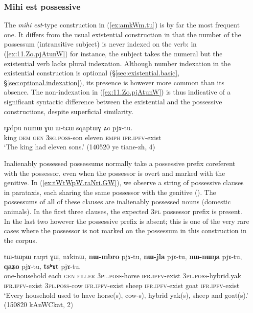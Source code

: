   
 \subsubsection{Mihi est possessive} \label{sec:possessive.mihi.est}
The \textit{mihi est}-type construction in (\ref{ex:amkWm.tu}) is by far the most frequent one.  It differs from the usual existential construction in that the number of the possessum (intransitive subject) is never indexed on the verb: in (\ref{ex:11.Zo.pjAtunW}) for instance, the subject  takes the numeral  but the existential verb  lacks plural indexation. Although number indexation in the existential construction is optional (§\ref{sec:existential.basic}, §\ref{sec:optional.indexation}), its presence is however more common than its absence. The non-indexation in (\ref{ex:11.Zo.pjAtunW}) is thus indicative of a significant syntactic difference between the existential and the possessive constructions, despite superficial similarity.
  
\begin{exe}
\ex \label{ex:11.Zo.pjAtunW}
\gll   rɟɤlpu nɯnɯ ɣɯ ɯ-tɕɯ sqaptɯɣ ʑo pjɤ-tu. \\
king \textsc{dem} \textsc{gen}  \textsc{3sg}.\textsc{poss}-son eleven \textsc{emph} \textsc{ifr}.\textsc{ipfv}-exist  \\
\glt `The king had eleven sons.' (140520 ye tiane-zh, 4)
 \end{exe}
 
Inalienably possessed possessums normally take a possessive prefix coreferent with the possessor, even when the possessor is overt and marked with the genitive. In (\ref{ex:tWtWpW.raNri.GW}), we observe a string of possessive clauses in parataxis, each sharing the same possessor with the genitive (). The possessums of all of these clauses are inalienably possessed nouns (domestic animals). In the first three clauses, the expected \textsc{3pl} possessor prefix is present. In the last two however the possessive prefix is absent; this is one of the very rare cases where the possessor is not marked on the possessum in this construction in the corpus.
 
 \begin{exe}
\ex \label{ex:tWtWpW.raNri.GW}
\gll tɯ-tɯpɯ raŋri ɣɯ, nɤkinɯ, \textbf{nɯ-mbro} pjɤ-tu, \textbf{nɯ-jla} pjɤ-tu, \textbf{nɯ-nɯŋa} pjɤ-tu, \textbf{qaʑo} pjɤ-tu, \textbf{tsʰɤt} pjɤ-tu. \\
one-household each \textsc{gen} \textsc{filler} \textsc{3pl}.\textsc{poss}-horse \textsc{ifr}.\textsc{ipfv}-exist 
\textsc{3pl}.\textsc{poss}-hybrid.yak \textsc{ifr}.\textsc{ipfv}-exist \textsc{3pl}.\textsc{poss}-cow \textsc{ifr}.\textsc{ipfv}-exist sheep  \textsc{ifr}.\textsc{ipfv}-exist  goat  \textsc{ifr}.\textsc{ipfv}-exist  \\
\glt `Every household used to have horse(s), cow-s), hybrid yak(s), sheep and goat(s).' (150820 kAnWCkat, 2)
 \end{exe}
 
